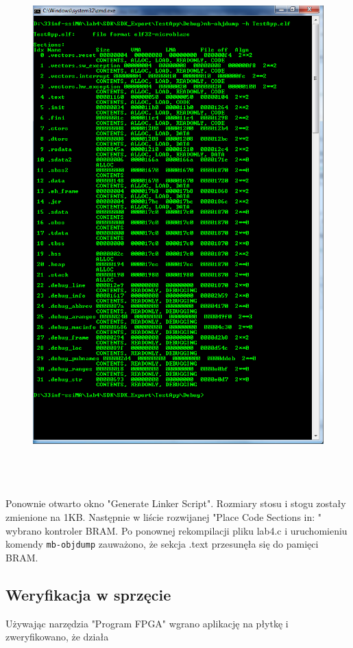 \begin{figure}[h]
	\centering
	\includegraphics[height=20cm]{img/objdump.PNG}
	\label{img:objdump}
\end{figure}

Ponownie otwarto okno "Generate Linker Script". Rozmiary stosu i stogu zostały zmienione na 1KB. Następnie w liście rozwijanej "Place Code Sections in: " wybrano kontroler BRAM.
\newpage
Po ponownej rekompilacji pliku lab4.c i uruchomieniu komendy \verb+mb-objdump+ zauważono, że sekcja .text przesunęła się do pamięci BRAM.

\subsection{Weryfikacja w sprzęcie}
Używając narzędzia "Program FPGA" wgrano aplikację na płytkę i zweryfikowano, że działa

